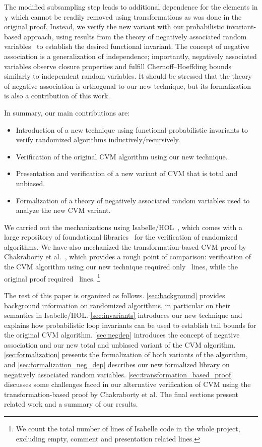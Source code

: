 The modified subsampling step leads to additional dependence for the elements in $\chi$ which cannot be readily removed using transformations as was done in the original proof.
Instead, we verify the new variant with our probabilistic invariant-based approach, using results from the theory of negatively associated random variables~\cite{joagdev1983} to establish the desired functional invariant.
The concept of negative association is a generalization of independence; importantly, negatively associated variables observe closure properties and fulfill Chernoff--Hoeffding bounds similarly to independent random variables.
It should be stressed that the theory of negative association is orthogonal to our new technique, but its formalization is also a contribution of this work.

In summary, our main contributions are:
\begin{itemize}
\item Introduction of a new technique using functional probabilistic invariants to verify randomized algorithms inductively/recursively.
\item Verification of the original CVM algorithm using our new technique.
\item Presentation and verification of a new variant of CVM that is total and unbiased.
\item Formalization of a theory of negatively associated random variables used to analyze the new CVM variant.
\end{itemize}

We carried out the mechanizations using Isabelle/HOL~\cite{nipkow2002}, which comes with a large repository of foundational libraries~\cite{afp} for the verification of randomized algorithms.
We have also mechanized the transformation-based CVM proof by Chakraborty et al.~\cite{chakraborty2022,chakraborty2023}, which provides a rough point of comparison:
verification of the CVM algorithm using our new technique required only \locnew~lines, while the original proof required \locold~lines.
\footnote{
  We count the total number of lines of Isabelle code in the whole project, excluding empty, comment and presentation related lines.
}

The rest of this paper is organized as follows.
\cref{sec:background} provides background information on randomized algorithms, in particular on their semantics in Isabelle/HOL.
\cref{sec:invariants} introduces our new technique and explains how probabilistic loop invariants can be used to establish tail bounds for the original CVM algorithm.
\cref{sec:negdep} introduces the concept of negative association and our new total and unbiased variant of the CVM algorithm.
\cref{sec:formalization} presents the formalization of both variants of the algorithm, and \cref{sec:formalization_neg_dep} describes our new formalized library on negatively associated random variables.
\cref{sec:transformation_based_proof} discusses some challenges faced in our alternative verification of CVM using the transformation-based proof by Chakraborty et al.
The final sections present related work and a summary of our results.

